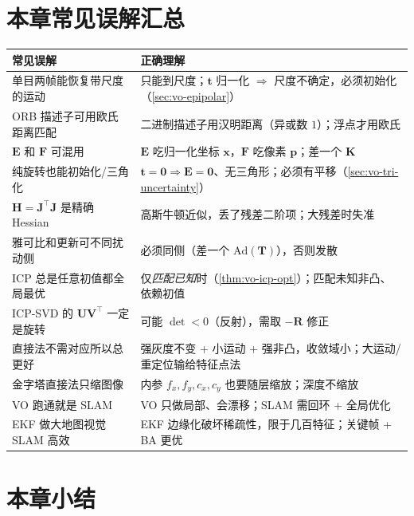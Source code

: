 \section*{本章常见误解汇总}
\begin{table}[H]\centering\small
\begin{tabular}{p{} p{}}
\toprule
\textbf{常见误解} & \textbf{正确理解} \\
\midrule
单目两帧能恢复带尺度的运动 & 只能到尺度；$\mathbf{t}$ 归一化 $\Rightarrow$ 尺度不确定，必须初始化（\cref{sec:vo-epipolar}）\\
ORB 描述子可用欧氏距离匹配 & 二进制描述子用汉明距离（异或数 $1$）；浮点才用欧氏 \\
$\mathbf{E}$ 和 $\mathbf{F}$ 可混用 & $\mathbf{E}$ 吃归一化坐标 $\mathbf{x}$，$\mathbf{F}$ 吃像素 $\mathbf{p}$；差一个 $\mathbf{K}$ \\
纯旋转也能初始化/三角化 & $\mathbf{t}=\mathbf{0}\Rightarrow\mathbf{E}=\mathbf{0}$、无三角形；必须有平移（\cref{sec:vo-tri-uncertainty}）\\
$\mathbf{H}=\mathbf{J}^\top\mathbf{J}$ 是精确 Hessian & 高斯牛顿近似，丢了残差二阶项；大残差时失准 \\
雅可比和更新可不同扰动侧 & 必须同侧（差一个 $\mathrm{Ad}(\mathbf{T})$），否则发散 \\
ICP 总是任意初值都全局最优 & 仅\emph{匹配已知}时（\cref{thm:vo-icp-opt}）；匹配未知非凸、依赖初值 \\
ICP-SVD 的 $\mathbf{U}\mathbf{V}^\top$ 一定是旋转 & 可能 $\det<0$（反射），需取 $-\mathbf{R}$ 修正 \\
直接法不需对应所以总更好 & 强灰度不变 + 小运动 + 强非凸，收敛域小；大运动/重定位输给特征点法 \\
金字塔直接法只缩图像 & 内参 $f_x,f_y,c_x,c_y$ 也要随层缩放；深度不缩放 \\
VO 跑通就是 SLAM & VO 只做局部、会漂移；SLAM 需回环 + 全局优化 \\
EKF 做大地图视觉 SLAM 高效 & EKF 边缘化破坏稀疏性，限于几百特征；关键帧 + BA 更优 \\
\bottomrule
\end{tabular}
\end{table}

\section*{本章小结}

